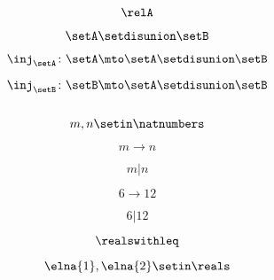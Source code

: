 {\begin{forslides}
    \begin{equation}
        \label{eq:parallelism-120}
        \relA
    \end{equation}

    \begin{equation}
        \label{eq:parallelism-121}
        \setA \setdisunion \setB
    \end{equation}

    \begin{equation}
        \label{eq:parallelism-122}
        \inj_\setA\colon \setA\mto \setA \setdisunion\setB
    \end{equation}

    \begin{equation}
        \label{eq:parallelism-123}
        \inj_\setB\colon \setB\mto \setA \setdisunion\setB
    \end{equation}

    \begin{equation}
        \label{eq:parallelism-124}
    \end{equation}

    \begin{equation}
        \label{eq:parallelism-125}
        m,n\setin \natnumbers
    \end{equation}

    \begin{equation}
        \label{eq:parallelism-126}
        m\to n
    \end{equation}

    \begin{equation}
        \label{eq:parallelism-127}
        m | n
    \end{equation}

    \begin{equation}
        \label{eq:parallelism-128}
        6\to 12
    \end{equation}

    \begin{equation}
        \label{eq:parallelism-129}
        6 | 12
    \end{equation}

    \begin{equation}
        \label{eq:parallelism-130}
        \realswithleq
    \end{equation}

    \begin{equation}
        \label{eq:parallelism-131}
        \elna{1},\elna{2}\setin \reals
    \end{equation}


\end{forslides}}
